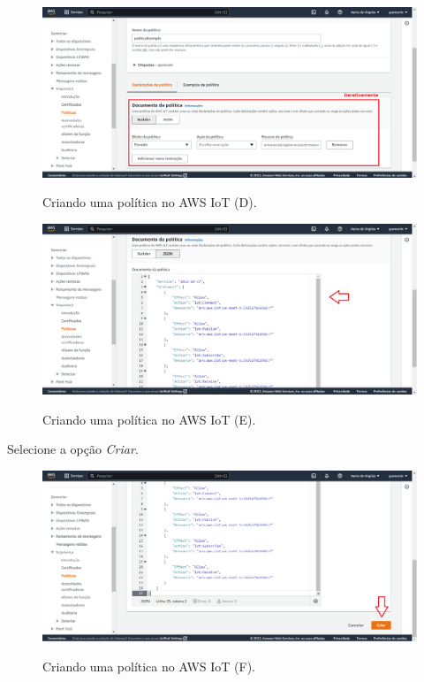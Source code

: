 \begin{figure}[H]
    \centering
    \caption{Criando uma política no AWS IoT (D).}
    \includegraphics[scale=0.472]{Imagens/criando_uma_politica_no_aws_iot_3.png}
    \label{fig:criando_uma_politica_no_aws_iot_d}
\end{figure}

\begin{figure}[H]
    \centering
    \caption{Criando uma política no AWS IoT (E).}
    \includegraphics[scale=0.472]{Imagens/criando_uma_politica_no_aws_iot_4.png}
    \label{fig:criando_uma_politica_no_aws_iot_e}
\end{figure}

Selecione a opção \textit{Criar}.

\begin{figure}[H]
    \centering
    \caption{Criando uma política no AWS IoT (F).}
    \includegraphics[scale=0.472]{Imagens/criando_uma_politica_no_aws_iot_5.png}
    \label{fig:criando_uma_politica_no_aws_iot_f}
\end{figure}



